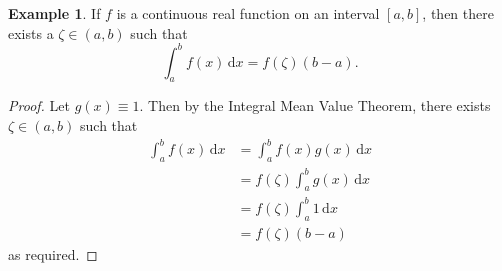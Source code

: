 \documentclass[12pt]{article}
\newcommand{\integral}[4]{\int_{#1}^{#2}\!{#3}\,\mathrm{d}{#4}}
\begin{document}
\theoremstyle{definition}
\newtheorem*{ex}{Example}
\begin{ex}
If $f$ is a continuous real function on an interval $[a,b]$, then there exists a $\zeta\in(a,b)$ such that
\[
  \integral{a}{b}{f(x)}{x}=f(\zeta)(b-a)
.\]
\end{ex}
\begin{proof}
Let $g(x)\equiv 1$. Then by the Integral Mean Value Theorem, there exists $\zeta\in(a,b)$ such that
\begin{align*}
  \integral{a}{b}{f(x)}{x} &= \integral{a}{b}{f(x)g(x)}{x} \\
                           &= f(\zeta)\integral{a}{b}{g(x)}{x} \\
                           &= f(\zeta)\integral{a}{b}{1}{x} \\
                           &= f(\zeta)(b-a)
\end{align*}
as required.
\end{proof}
\end{document}
